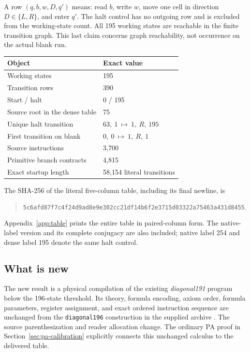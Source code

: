 \documentclass[11pt,letterpaper]{article}
\newcommand{\file}[1]{\texttt{\nolinkurl{#1}}}
\begin{document}
A row \((q,b,w,D,q')\) means: read \(b\), write \(w\), move one cell in
direction \(D\in\{L,R\}\), and enter \(q'\). The halt control has no
outgoing row and is excluded from the working-state count. All 195
working states are reachable in the finite transition graph. This last
claim concerns graph reachability, not occurrence on the actual blank run.
\begin{center}
\begin{tabular}{@{}ll@{}}
\toprule
Object & Exact value\\
\midrule
Working states & 195\\
Transition rows & 390\\
Start / halt & 0 / 195\\
Source root in the dense table & 75\\
Unique halt transition & \(63,\ 1\ \mapsto\ 1,\ R,\ 195\)\\
First transition on blank & \(0,\ 0\ \mapsto\ 1,\ R,\ 1\)\\
Source instructions & 3,700\\
Primitive branch contracts & 4,815\\
Exact startup length & 58,154 literal transitions\\
\bottomrule
\end{tabular}
\end{center}
The SHA-256 of the literal five-column table, including its final newline, is
\begin{quote}\small
\nolinkurl{5c6afd87f7c4f24d9ad8e9e302cc21df14b6f2e3715d03322a75463a431d8455}.
\end{quote}
Appendix~\ref{app:table} prints the entire table in paired-column form.
The native-label version and its complete conjugacy are also included;
native label 254 and dense label 195 denote the same halt control.

\subsection{What is new}
The new result is a physical compilation of the existing
\emph{diagonal191} program below the 196-state threshold. Its theory,
formula encoding, axiom order, formula parameters, register assignment,
and exact ordered instruction sequence are unchanged from the
\file{diagonal196} construction in the supplied archive \cite{diagonal}.
The source parenthesization and reader allocation change.
The ordinary PA proof in Section~\ref{sec:pa-calibration} explicitly
connects this unchanged calculus to the delivered table.
\end{document}
